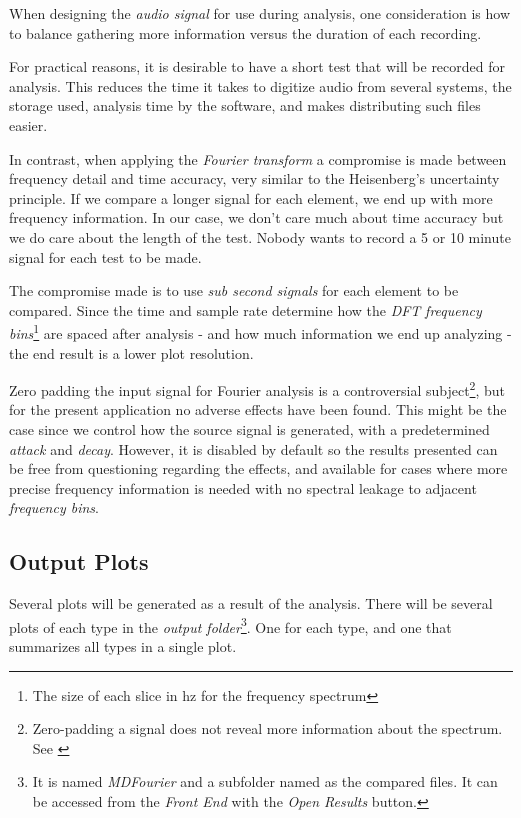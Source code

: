 \documentclass[10pt,a4paper]{report}
\begin{document}
When designing the \textit{audio signal} for use during analysis, one consideration is how to balance gathering more information versus the duration of each recording. 

For practical reasons, it is desirable to have a short test that will be recorded for analysis. This reduces the time it takes to digitize audio from several systems, the storage used, analysis time by the software, and makes distributing such files easier.

In contrast, when applying the \textit{Fourier transform} a compromise is made between frequency detail and time accuracy, very similar to the Heisenberg's uncertainty principle. If we compare a longer signal for each element, we end up with more frequency information. In our case, we don't care much about time accuracy but we do care about the length of the test. Nobody wants to record a 5 or 10 minute signal for each test to be made.

The compromise made is to use \textit{sub second signals} for each element to be compared. Since the time and sample rate determine how the \textit{DFT} \textit{frequency bins}\footnote{The size of each slice in hz for the frequency spectrum} are spaced after analysis - and how much information we end up analyzing - the end result is a lower plot resolution.

Zero padding the input signal for Fourier analysis is a controversial subject\footnote{Zero-padding a signal does not reveal more information about the spectrum. See \cite{zeropaddinginterpolate} \cite{ZeroPaddingBad}}, but for the present application no adverse effects have been found. This might be the case since we control how the source signal is generated, with a predetermined \textit{attack} and \textit{decay}. However, it is disabled by default so the results presented can be free from questioning regarding the effects, and available for cases where more precise frequency information is needed with no spectral leakage to adjacent \textit{frequency bins}.

\subsection{Output Plots}
\label{outputfiles}

Several plots will be generated as a result of the analysis. There will be several plots of each type in the \textit{output folder}\footnote{It is named \textit{MDFourier} and a subfolder named as the compared files. It can be accessed from the \textit{Front End} with the \textit{Open Results} button.}. One for each type, and one that summarizes all types in a single plot.
\end{document}
